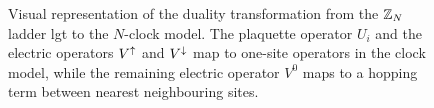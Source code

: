 \begin{figure}[t]
    \centering
    
    \caption[Duality map of $\Z_N$ ladder \ac{lgt}]{Visual representation of the duality transformation from the $\Z_N$ ladder \ac{lgt} to the $N$-clock model.
    The plaquette operator $U_i$ and the electric operators $V^{\uparrow}$ and $V^{\downarrow}$ map to one-site operators in the clock model, while
    the remaining electric operator $V^0$ maps to a hopping term between nearest neighbouring sites.}
    \label{fig:ladder_duality}
\end{figure}


